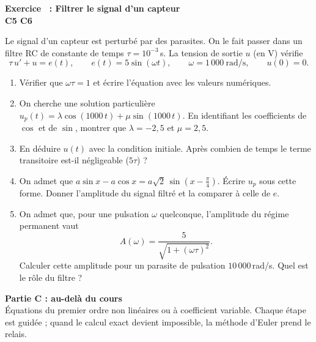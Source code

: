 \documentclass[a4paper,11pt]{article}
\newcounter{exo}
\newcommand{\partie}[2]{\needspace{\dimexpr0.5\textheight+2.5cm\relax}\vspace{6pt}%
\begin{tcolorbox}[colback=uimmblue, colframe=uimmblue, sharp corners, boxrule=0pt, left=10pt, top=5pt, bottom=5pt]
{\color{white}\large\bfseries #1}\\[1pt]{\color{white}\small #2}
\end{tcolorbox}}
\newcommand{\exo}[4]{\needspace{0.5\textheight}\refstepcounter{exo}\label{exo:\theexo}\vspace{8pt}%
\begin{tcolorbox}[colback=uimmlightblue, colframe=uimmblue, boxrule=0.8pt, arc=2pt, left=6pt, right=6pt, top=3pt, bottom=3pt]
{\color{uimmblue}\bfseries Exercice \theexo\ : #1}\\
{\small\color{uimmred}\bfseries #2\quad #3}%
\if\relax\detokenize{#4}\relax\else\\{\footnotesize\color{uimmgray}\itshape #4}\fi
\end{tcolorbox}}
\newcommand{\rep}[1]{\par\noindent\begin{minipage}[t][#1cm]{\linewidth}\mbox{}\end{minipage}\par}
\begin{document}
\exo{Filtrer le signal d'un capteur}{C5 C6}{[S01] [C01]}{}
Le signal d'un capteur est perturbé par des parasites. On le fait passer dans un filtre RC de constante de temps $\tau = 10^{-3}$\,s. La tension de sortie $u$ (en V) vérifie
\[
\tau\,u' + u = e(t), \qquad e(t) = 5\sin(\omega t), \qquad \omega = 1\,000\ \text{rad/s}, \qquad u(0) = 0 .
\]
\begin{enumerate}
  \needspace{3.1cm}
  \item Vérifier que $\omega\tau = 1$ et écrire l'équation avec les valeurs numériques.
  \rep{1.5}
  \needspace{7.1cm}
  \item On cherche une solution particulière $u_p(t) = \lambda\cos(1000\,t) + \mu\sin(1000\,t)$. En identifiant les coefficients de $\cos$ et de $\sin$, montrer que $\lambda = -2{,}5$ et $\mu = 2{,}5$.
  \rep{4.5}
  \needspace{5.1cm}
  \item En déduire $u(t)$ avec la condition initiale. Après combien de temps le terme transitoire est-il négligeable ($5\tau$) ?
  \rep{3}
  \needspace{4.6cm}
  \item On admet que $a\sin x - a\cos x = a\sqrt{2}\,\sin\!\left(x - \frac{\pi}{4}\right)$. Écrire $u_p$ sous cette forme. Donner l'amplitude du signal filtré et la comparer à celle de $e$.
  \rep{2.5}
  \needspace{6.6cm}
  \item On admet que, pour une pulsation $\omega$ quelconque, l'amplitude du régime permanent vaut
  \[ A(\omega) = \frac{5}{\sqrt{1 + (\omega\tau)^2}} . \]
  Calculer cette amplitude pour un parasite de pulsation $10\,000$\,rad/s. Quel est le rôle du filtre ?
  \rep{3}
\end{enumerate}

\partie{Partie C : au-delà du cours}{Équations du premier ordre non linéaires ou à coefficient variable. Chaque étape est guidée ; quand le calcul exact devient impossible, la méthode d'Euler prend le relais.}
\end{document}
